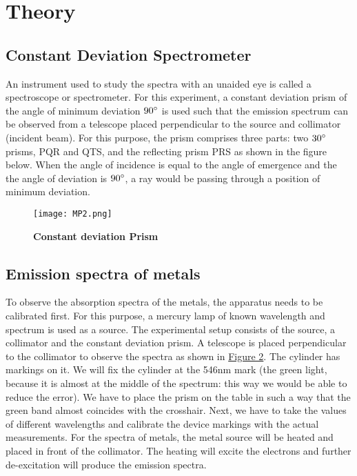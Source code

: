 \section{Theory}
\subsection{Constant Deviation Spectrometer}
An instrument used to study the spectra with an unaided eye is called a spectroscope or spectrometer. For this experiment, a constant deviation prism of the angle of minimum deviation $90 \degree$ is used such that the emission spectrum can be observed from a telescope placed perpendicular to the source and collimator (incident beam). For this purpose, the prism comprises three parts: two $30 \degree$ prisms, PQR and QTS, and the reflecting prism PRS as shown in the figure below. When the angle of incidence is equal to the angle of emergence and the
the angle of deviation is $90 \degree$, a ray would be passing through a position of minimum deviation. 

\begin{figure}[H]
\texttt{[image: MP2.png]}
\caption{\textbf{Constant deviation Prism}}
\label{fig1}
\end{figure}

\subsection{Emission spectra of metals}
To observe the absorption spectra of the metals, the apparatus needs to be calibrated first. For this purpose, a mercury lamp of known wavelength and spectrum is used as a source. The experimental setup consists of the source, a collimator and the constant deviation prism. A telescope is placed perpendicular to the collimator to observe the spectra as shown in \hyperref[fig:2]{Figure 2}. The cylinder has markings on it. We will fix the cylinder at the 546nm mark (the green light, because it is almost at the middle of the spectrum: this way we would be able to reduce the error). We have to place the prism on the table in such a way that the green band almost coincides with the crosshair. Next, we have to take the values of different wavelengths and calibrate the device markings with the actual measurements. For the spectra of metals, the metal source will be heated and placed in front of the collimator. The heating will excite the electrons and further de-excitation will produce the emission spectra.


